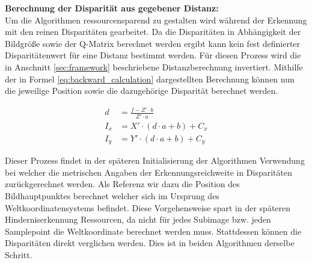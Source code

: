 	
\noindent
\textbf{Berechnung der Disparität aus gegebener Distanz:}\\
Um die Algorithmen ressourcensparend zu gestalten wird während der Erkennung mit den reinen Disparitäten gearbeitet. Da die Disparitäten in Abhängigkeit der Bildgröße sowie der Q-Matrix berechnet werden ergibt kann kein fest definierter Disparitätenwert für eine Distanz bestimmt werden. Für diesen Prozess wird die in Anschnitt \ref{sec:framework} beschriebene Distanzberechnung invertiert. Mithilfe der in Formel \ref{eq:backward_calculation} dargestellten Berechnung können nun die jeweilige Position sowie die dazugehörige Disparität berechnet werden. 

\begin{equation}
  \label{eq:backward_calculation}
  \begin{aligned}
    d &= \frac{f- Z' \cdot b}{Z' \cdot a}\\
    I_x &= X' \cdot (d \cdot a + b) + C_x\\
    I_y &= Y' \cdot (d \cdot a + b) + C_y
  \end{aligned}
\end{equation}

\noindent
Dieser Prozess findet in der späteren Initialisierung der Algorithmen Verwendung bei welcher die metrischen Angaben der Erkennungsreichweite in Disparitäten zurückgerechnet werden. Als Referenz wir dazu die Position des Bildhauptpunktes berechnet welcher sich im Ursprung des Weltkoordinatensystems befindet. Diese Vorgehensweise spart in der späteren Hinderniserkennung Ressourcen, da nicht für jedes Subimage bzw. jeden Samplepoint die Weltkoordinate berechnet werden muss. Stattdessen können die Disparitäten direkt verglichen werden. Dies ist in beiden Algorithmen derselbe Schritt.\\



